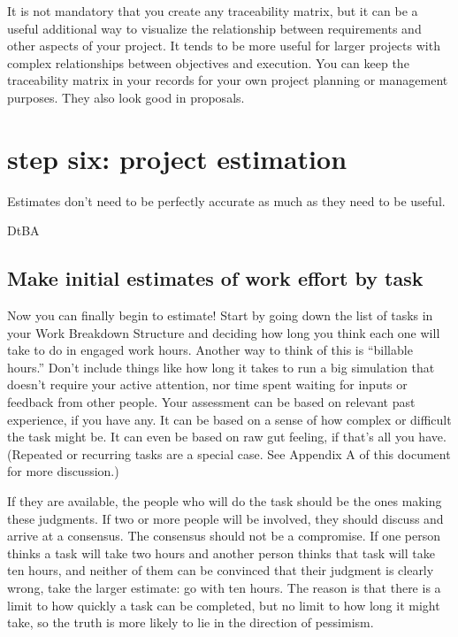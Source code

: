 \documentclass[12pt,oneside]{book}
\begin{document}
It is not mandatory that you create any traceability matrix, but it can be a useful additional way to visualize the relationship between requirements and other aspects of your project. It tends to be more useful for larger projects with complex relationships between objectives and execution. You can keep the traceability matrix in your records for your own project planning or management purposes. They also look good in proposals.

\newpage
{}
\section*{step six: project estimation}

\epigraph{Estimates don't need to be perfectly accurate as much as they need to be useful.}{DtBA}

\subsection*{Make initial estimates of work effort by task}

Now you can finally begin to estimate! Start by going down the list of tasks in your Work Breakdown Structure and deciding how long you think each one will take to do in engaged work hours. Another way to think of this is ``billable hours.'' Don't include things like how long it takes to run a big simulation that doesn't require your active attention, nor time spent waiting for inputs or feedback from other people. Your assessment can be based on relevant past experience, if you have any. It can be based on a sense of how complex or difficult the task might be. It can even be based on raw gut feeling, if that's all you have. (Repeated or recurring tasks are a special case. See Appendix A of this document for more discussion.)

If they are available, the people who will do the task should be the ones making these judgments. If two or more people will be involved, they should discuss and arrive at a consensus. The consensus should not be a compromise. If one person thinks a task will take two hours and another person thinks that task will take ten hours, and neither of them can be convinced that their judgment is clearly wrong, take the larger estimate: go with ten hours. The reason is that there is a limit to how quickly a task can be completed, but no limit to how long it might take, so the truth is more likely to lie in the direction of pessimism.
\end{document}
